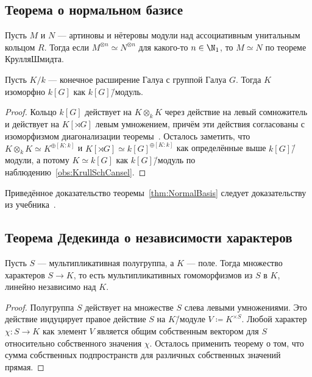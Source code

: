 \documentclass[
	extrafontsizes,
	11pt,
	hyphens,
]{memoir}
\begin{document}
\subsection{Теорема о нормальном базисе}

\begin{observation}
Пусть \(M\) и \(N\) --- артиновы и нётеровы модули над ассоциативным унитальным кольцом \(R\).
\label{obs:KrullSchCansel}
Тогда если \(M^{\otimes n} \simeq N^{\otimes n}\) для какого-то \(n \in \N_1\), то \(M \simeq N\) по теореме Крулля\namedash{}Шмидта.
\end{observation}

\begin{theorem}
Пусть \(K/k\) --- конечное расширение Галуа с группой Галуа \(G\).%
\label{thm:NormalBasis}
Тогда \(K\) изоморфно \(k[G]\) как \(k[G]\)\=/модуль.
\end{theorem}

\begin{proof}
Кольцо \(k[G]\) действует на \(K \otimes_k K\) через действие на левый сомножитель и действует на \(K[\rtimes G]\) левым умножением,
причём эти действия согласованы с изоморфизмом диагонализации теоремы~.
Осталось заметить, что \(K \otimes_k K \simeq K^{\oplus [K : k]}\) и \(K[\rtimes G] \simeq k[G]^{\oplus [K : k]}\) как определённые выше \(k[G]\)\=/модули,
а потому \(K \simeq k[G]\) как \(k[G]\)\=/модуль по наблюдению~\ref{obs:KrullSchCansel}.
\end{proof}

\begin{remark}
Приведённое доказательство теоремы~\ref{thm:NormalBasis} следует доказательству из учебника~\cite[70]{milneFT_v5.10}.
\end{remark}

\subsection{Теорема Дедекинда о независимости характеров}

\begin{theorem}
Пусть \(S\) --- мультипликативная полугруппа, а \(K\) --- поле.%
\label{thm:DedekindCharInd}
Тогда множество характеров \(S \to K\), то есть мультипликативных гомоморфизмов из \(S\) в \(K\), линейно независимо над \(K\).
\end{theorem}

\begin{proof}
Полугруппа \(S\) действует на множестве \(S\) слева левыми умножениями. Это действие индуцирует правое действие \(S\) на \(K\)\=/модуле \(V \coloneqq K^{\times S}\).
Любой характер \(\chi : S \to K\) как элемент \(V\) является общим собственным вектором для \(S\) относительно собственного значения \(\chi\).
Осталось применить теорему о том, что сумма собственных подпространств для различных собственных значений прямая.
\end{proof}
\end{document}
